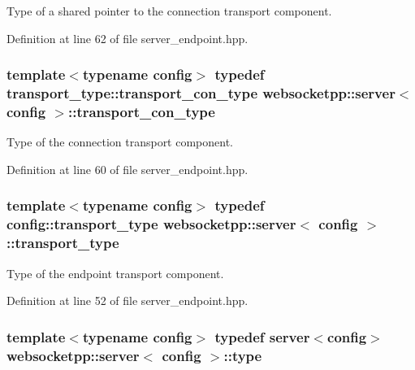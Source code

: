 Type of a shared pointer to the connection transport component. 



Definition at line 62 of file server\+\_\+endpoint.\+hpp.

\hypertarget{classwebsocketpp_1_1server_a0515060720d024fb5d0ee7db1b4498a6}{}
\subsubsection[{transport\+\_\+con\+\_\+type}]{\setlength{\rightskip}{0pt plus 5cm}template$<$typename config$>$ typedef transport\+\_\+type\+::transport\+\_\+con\+\_\+type {\bf websocketpp\+::server}$<$ config $>$\+::{\bf transport\+\_\+con\+\_\+type}}\label{classwebsocketpp_1_1server_a0515060720d024fb5d0ee7db1b4498a6}


Type of the connection transport component. 



Definition at line 60 of file server\+\_\+endpoint.\+hpp.

\hypertarget{classwebsocketpp_1_1server_a762a51efebd0c0f87918f0369434f04f}{}
\subsubsection[{transport\+\_\+type}]{\setlength{\rightskip}{0pt plus 5cm}template$<$typename config$>$ typedef config\+::transport\+\_\+type {\bf websocketpp\+::server}$<$ config $>$\+::{\bf transport\+\_\+type}}\label{classwebsocketpp_1_1server_a762a51efebd0c0f87918f0369434f04f}


Type of the endpoint transport component. 



Definition at line 52 of file server\+\_\+endpoint.\+hpp.

\hypertarget{classwebsocketpp_1_1server_a265fd3d99141089206f0053c6b842790}{}
\subsubsection[{type}]{\setlength{\rightskip}{0pt plus 5cm}template$<$typename config$>$ typedef {\bf server}$<$config$>$ {\bf websocketpp\+::server}$<$ config $>$\+::{\bf type}}\label{classwebsocketpp_1_1server_a265fd3d99141089206f0053c6b842790}


